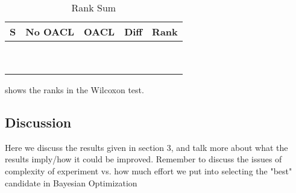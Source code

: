 \begin{table}[H]
	\centering
	\caption{Rank Sum}
	\label{fig:wilcoxon}
	\begin{tabular}{@{}l|llll@{}}
		\toprule
		S & No OACL & OACL & Diff & Rank \\ \midrule
		&               &                 &      &      \\
		&               &                 &      &      \\
		&               &                 &      &      \\
		&               &                 &      &      \\
		&               &                 &      &      \\
		&               &                 &      &      \\
		&               &                 &      &      \\
		&               &                 &      &      \\
		&               &                 &      &      \\ \bottomrule
	\end{tabular}
\end{table}
 shows the ranks in the Wilcoxon test.

\subsection{Discussion}
Here we discuss the results given in section 3, and talk more about what the results imply/how it could be improved.
Remember to discuss the issues of complexity of experiment vs. how much effort we put into selecting the "best" candidate in Bayesian Optimization